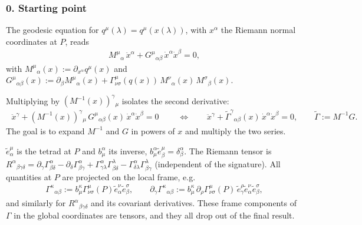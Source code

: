 \documentclass[letterpaper,10pt,english]{jupyterBook}
\begin{document}
\subsubsection{0. Starting point}
\label{\detokenize{ch/relativity-general/geodesics-linearization:starting-point}}
\sphinxAtStartPar
The geodesic equation for \(q^\mu(\lambda)=q^\mu(x(\lambda))\), with \(x^\alpha\) the Riemann normal coordinates at \(P\), reads
\begin{equation*}
\begin{split}
M^\mu{}_\alpha\,\ddot x^\alpha+G^\mu{}_{\alpha\beta}\,\dot x^\alpha\dot x^\beta=0 ,
\end{split}
\end{equation*}
\sphinxAtStartPar
with \(M^\mu{}_\alpha(x):=\partial_{x^\alpha}q^\mu(x)\) and \(G^\mu{}_{\alpha\beta}(x):=\partial_\beta M^\mu{}_\alpha(x)+\Gamma^\mu_{\nu\sigma}(q(x))\,M^\nu{}_\alpha(x)\,M^\sigma{}_\beta(x)\).

\sphinxAtStartPar
Multiplying by \((M^{-1}(x))^\gamma{}_\mu\) isolates the second derivative:
\begin{equation*}
\begin{split}
\boxed{\;\ddot x^\gamma+(M^{-1}(x))^\gamma{}_\mu\,G^\mu{}_{\alpha\beta}(x)\,\dot x^\alpha\dot x^\beta=0\;}
\qquad\Longleftrightarrow\qquad
\ddot x^\gamma+\tilde\Gamma^\gamma{}_{\alpha\beta}(x)\,\dot x^\alpha\dot x^\beta=0,
\qquad \tilde\Gamma:=M^{-1}G .
\end{split}
\end{equation*}
\sphinxAtStartPar
The goal is to expand \(M^{-1}\) and \(G\) in powers of \(x\) and multiply the two series.

\sphinxAtStartPar
{} \(\tilde e^\mu_\alpha\) is the tetrad at \(P\) and \(b^\alpha_\mu\) its inverse, \(b^\alpha_\mu\tilde e^\mu_\beta=\delta^\alpha_\beta\). The Riemann tensor is \(R^\alpha{}_{\beta\gamma\delta}=\partial_\gamma\Gamma^\alpha_{\beta\delta}-\partial_\delta\Gamma^\alpha_{\beta\gamma}+\Gamma^\alpha_{\gamma\lambda}\Gamma^\lambda_{\beta\delta}-\Gamma^\alpha_{\delta\lambda}\Gamma^\lambda_{\beta\gamma}\) (independent of the signature). All quantities at \(P\) are projected on the local frame, e.g.
\begin{equation*}
\begin{split}
\Gamma^\kappa{}_{\alpha\beta}:=b^\kappa_\mu\Gamma^\mu_{\nu\sigma}(P)\tilde e^\nu_\alpha\tilde e^\sigma_\beta,\qquad
\partial_\gamma\Gamma^\kappa{}_{\alpha\beta}:=b^\kappa_\mu\,\partial_\rho\Gamma^\mu_{\nu\sigma}(P)\,\tilde e^\rho_\gamma\tilde e^\nu_\alpha\tilde e^\sigma_\beta ,
\end{split}
\end{equation*}
\sphinxAtStartPar
and similarly for \(R^\alpha{}_{\beta\gamma\delta}\) and its covariant derivatives. These frame components of \(\Gamma\) in the global coordinates are  tensors, and they all drop out of the final result.
\end{document}

